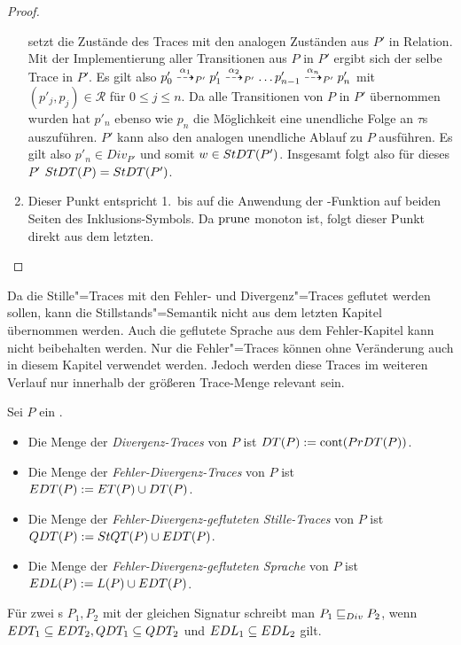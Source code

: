 \begin{proof}
\begin{enumerate}
      setzt die Zustände des Traces mit den analogen Zuständen aus $P'$ in
      Relation. Mit der Implementierung aller Transitionen aus $P$
      in $P'$ ergibt sich der selbe Trace in $P'$. Es gilt also $p'_0
      \may[\alpha _1]_{P'} p'_1 \may[\alpha _2]_{P'} \dots p'_{n-1} \may[\alpha
      _n]_{P'} p'_n$ mit $(p'_j,p_j) \in \mathcal{R}$ für $0\leq j \leq n$. Da
      alle Transitionen von $P$ in $P'$ übernommen wurden hat $p'_n$ ebenso wie
      $p_n$ die Möglichkeit eine unendliche Folge an $\tau$s auszuführen. $P'$
      kann also den analogen unendliche Ablauf zu $P$ ausführen. Es gilt also
      $p'_n\in Div _{P'}$ und somit $w\in StDT (P')$. Insgesamt folgt also für
      dieses $P'$ $StDT (P) = StDT (P')$.
    \item Dieser Punkt entspricht 1.\ bis auf die Anwendung der
      \prune{}-Funktion auf beiden Seiten des Inklusions-Symbols. Da $\mathrm{prune}{}$
      monoton ist, folgt dieser Punkt direkt aus dem letzten.
  \end{enumerate}
\end{proof}

Da die Stille"=Traces mit den Fehler- und Divergenz"=Traces geflutet werden
sollen, kann die Stillstands"=Semantik nicht aus dem letzten Kapitel übernommen
werden. Auch die geflutete Sprache aus dem Fehler-Kapitel kann nicht
beibehalten werden. Nur die Fehler"=Traces \ET{} können ohne Veränderung auch
in diesem Kapitel verwendet werden. Jedoch werden diese Traces im weiteren
Verlauf nur innerhalb der größeren Trace-Menge \EDT{} relevant sein.

\begin{Def}
  \label{DivSemDef}
  Sei $P$ ein \MEIO{}.
  \begin{itemize}
    \item Die Menge der \emph{Divergenz-Traces} von $P$ ist $DT (P) := \mathrm{cont}
      (PrDT (P))$.
    \item Die Menge der \emph{Fehler-Divergenz-Traces} von $P$ ist $EDT (P) :=
      ET (P)\cup DT (P)$.
    \item Die Menge der \emph{Fehler-Divergenz-gefluteten
      Stille-Traces} von $P$ ist $QDT (P) := StQT (P)\cup EDT (P)$.
    \item Die Menge der \emph{Fehler-Divergenz-gefluteten
      Sprache} von $P$ ist $EDL (P) := L(P)\cup EDT (P)$.
  \end{itemize}
  Für zwei \MEIO{}s $P_1,P_2$ mit der gleichen Signatur schreibt man $P_1 \sqsubseteq  _{Div}
  P_2$, wenn $EDT _1\subseteq EDT _2, QDT _1\subseteq QDT _2$ und $EDL
  _1\subseteq EDL _2$ gilt.
\end{Def}

